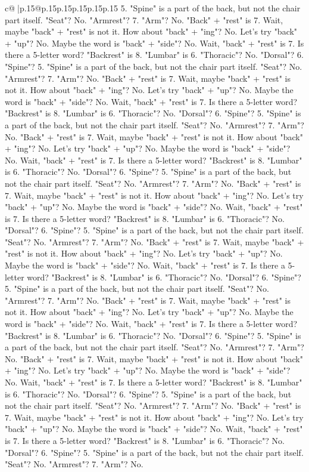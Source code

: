 \documentclass{article}
\begin{document}
{\begin{supertabular}{c@{$\;$}|p{.15\linewidth}@{}p{.15\linewidth}p{.15\linewidth}p{.15\linewidth}p{.15\linewidth}p{.15\linewidth}}
{{{5. "Spine" is a part of the back, but not the chair part itself. "Seat"? No. "Armrest"? 7. "Arm"? No. "Back" + "rest" is 7. Wait, maybe "back" + "rest" is not it. How about "back" + "ing"? No. Let's try "back" + "up"? No. Maybe the word is "back" + "side"? No. Wait, "back" + "rest" is 7. Is there a 5{-}letter word? "Backrest" is 8. "Lumbar" is 6. "Thoracic"? No. "Dorsal"? 6. "Spine"? 5. "Spine" is a part of the back, but not the chair part itself. "Seat"? No. "Armrest"? 7. "Arm"? No. "Back" + "rest" is 7. Wait, maybe "back" + "rest" is not it. How about "back" + "ing"? No. Let's try "back" + "up"? No. Maybe the word is "back" + "side"? No. Wait, "back" + "rest" is 7. Is there a 5{-}letter word? "Backrest" is 8. "Lumbar" is 6. "Thoracic"? No. "Dorsal"? 6. "Spine"? 5. "Spine" is a part of the back, but not the chair part itself. "Seat"? No. "Armrest"? 7. "Arm"? No. "Back" + "rest" is 7. Wait, maybe "back" + "rest" is not it. How about "back" + "ing"? No. Let's try "back" + "up"? No. Maybe the word is "back" + "side"? No. Wait, "back" + "rest" is 7. Is there a 5{-}letter word? "Backrest" is 8. "Lumbar" is 6. "Thoracic"? No. "Dorsal"? 6. "Spine"? 5. "Spine" is a part of the back, but not the chair part itself. "Seat"? No. "Armrest"? 7. "Arm"? No. "Back" + "rest" is 7. Wait, maybe "back" + "rest" is not it. How about "back" + "ing"? No. Let's try "back" + "up"? No. Maybe the word is "back" + "side"? No. Wait, "back" + "rest" is 7. Is there a 5{-}letter word? "Backrest" is 8. "Lumbar" is 6. "Thoracic"? No. "Dorsal"? 6. "Spine"? 5. "Spine" is a part of the back, but not the chair part itself. "Seat"? No. "Armrest"? 7. "Arm"? No. "Back" + "rest" is 7. Wait, maybe "back" + "rest" is not it. How about "back" + "ing"? No. Let's try "back" + "up"? No. Maybe the word is "back" + "side"? No. Wait, "back" + "rest" is 7. Is there a 5{-}letter word? "Backrest" is 8. "Lumbar" is 6. "Thoracic"? No. "Dorsal"? 6. "Spine"? 5. "Spine" is a part of the back, but not the chair part itself. "Seat"? No. "Armrest"? 7. "Arm"? No. "Back" + "rest" is 7. Wait, maybe "back" + "rest" is not it. How about "back" + "ing"? No. Let's try "back" + "up"? No. Maybe the word is "back" + "side"? No. Wait, "back" + "rest" is 7. Is there a 5{-}letter word? "Backrest" is 8. "Lumbar" is 6. "Thoracic"? No. "Dorsal"? 6. "Spine"? 5. "Spine" is a part of the back, but not the chair part itself. "Seat"? No. "Armrest"? 7. "Arm"? No. "Back" + "rest" is 7. Wait, maybe "back" + "rest" is not it. How about "back" + "ing"? No. Let's try "back" + "up"? No. Maybe the word is "back" + "side"? No. Wait, "back" + "rest" is 7. Is there a 5{-}letter word? "Backrest" is 8. "Lumbar" is 6. "Thoracic"? No. "Dorsal"? 6. "Spine"? 5. "Spine" is a part of the back, but not the chair part itself. "Seat"? No. "Armrest"? 7. "Arm"? No. "Back" + "rest" is 7. Wait, maybe "back" + "rest" is not it. How about "back" + "ing"? No. Let's try "back" + "up"? No. Maybe the word is "back" + "side"? No. Wait, "back" + "rest" is 7. Is there a 5{-}letter word? "Backrest" is 8. "Lumbar" is 6. "Thoracic"? No. "Dorsal"? 6. "Spine"? 5. "Spine" is a part of the back, but not the chair part itself. "Seat"? No. "Armrest"? 7. "Arm"? No. }}}
\end{supertabular}}
\end{document}
